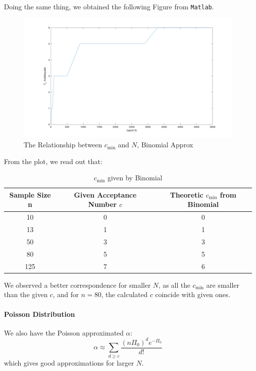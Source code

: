 \documentclass[a4paper]{article}
\begin{document}
Doing the same thing, we obtained the following Figure from \texttt{Matlab}.
\begin{figure}[!htbp] 
\centering 
\includegraphics[width=1\linewidth]{alpha-bino.png}  
\caption{The Relationship between $c_{\min}$ and $N$, Binomial Approx} 
\end{figure}

From the plot, we read out that:
\begin{table}[!htbp]
  \centering
    \begin{tabular}{ccc}
    \hline
    Sample Size n & Given Acceptance Number $c$ & Theoretic $c_{\min}$ from Binomial \\
    \hline
    10    & 0     & 0 \\
    13    & 1     & 1 \\
    50    & 3     & 3 \\
    80    & 5     & 5 \\
    125   & \cellcolor[rgb]{ .851,  .882,  .949}7 & \cellcolor[rgb]{ .851,  .882,  .949}6 \\
    \hline
    \end{tabular}%
    \caption{$c_{\min}$ given by Binomial}
\end{table}%

We observed a better correspondence for smaller $N$, as all the $c_{\min}$ are smaller than the given $c$, and for $n=80$, the calculated $c$ coincide with given ones.

\newpage

\paragraph{Poisson Distribution}
We also have the Poisson approximated $\alpha$:
$$\alpha \approx \sum_{d\geq c} \frac{(n\Pi_0)^de^{-\Pi_0}}{d!}$$
which gives good approximations for larger $N$.
\end{document}
